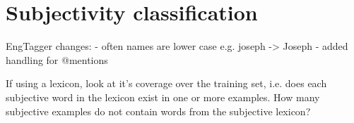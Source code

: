 \chapter{Subjectivity classification}
\label{subjectivity}

EngTagger changes:
	- often names are lower case e.g. joseph -> Joseph
	- added handling for @mentions

If using a lexicon, look at it's coverage over the training set, i.e. does each subjective word in the lexicon exist in one or more examples. How many subjective examples do not contain words from the subjective lexicon?